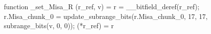 function _set_Misa_R (r_ref, v) = {
    r = __bitfield_deref(r_ref);
    r.Misa_chunk_0 = update_subrange_bits(r.Misa_chunk_0, 17, 17, subrange_bits(v, 0, 0));
    (*r_ref) = r
}
